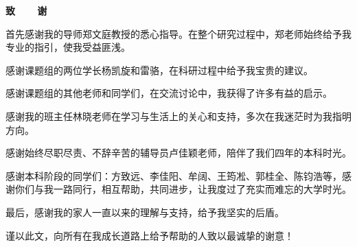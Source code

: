 \cleardoublepage{}
\vspace*{-2em}
\begin{center}
    \bfseries {} 致~~~~谢
\end{center}

首先感谢我的导师郑文庭教授的悉心指导。在整个研究过程中，郑老师始终给予我专业的指引，使我受益匪浅。

感谢课题组的两位学长杨凯旋和雷骆，在科研过程中给予我宝贵的建议。

感谢课题组的其他老师和同学们，在交流讨论中，我获得了许多有益的启示。

感谢我的班主任林晓老师在学习与生活上的关心和支持，多次在我迷茫时为我指明方向。

感谢始终尽职尽责、不辞辛苦的辅导员卢佳颖老师，陪伴了我们四年的本科时光。

感谢本科阶段的同学们：方致远、李佳阳、牟阔、王筠凇、郭桂全、陈钧浩等，感谢你们与我一路同行，相互帮助，共同进步，让我度过了充实而难忘的大学时光。

最后，感谢我的家人一直以来的理解与支持，给予我坚实的后盾。

谨以此文，向所有在我成长道路上给予帮助的人致以最诚挚的谢意！